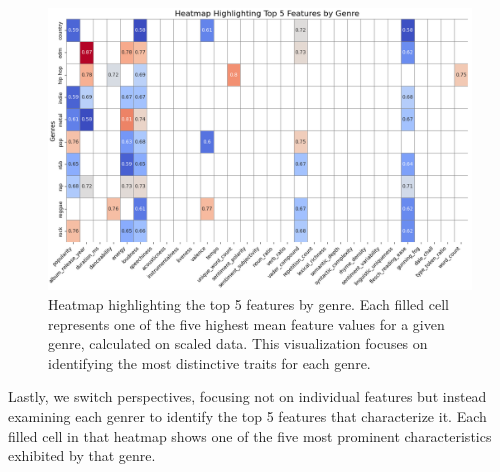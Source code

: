 \begin{center}
\begin{figure}[H]
  \centering
  \includegraphics[width=6in]{img/heatmap_top_feature_values_by_genre.png}
  \caption{Heatmap highlighting the top 5 features by genre. Each filled cell
  represents one of the five highest mean feature values for a given genre,
calculated on scaled data. This visualization focuses on identifying the most
distinctive traits for each genre.}
  \label{Figure:dendrogram_spotify_features}
\end{figure}
\end{center}

Lastly, we switch perspectives, focusing not on individual features but instead
examining each genrer to identify the top 5 features that characterize it. Each
filled cell in that heatmap shows one of the five most prominent
characteristics exhibited by that genre.

